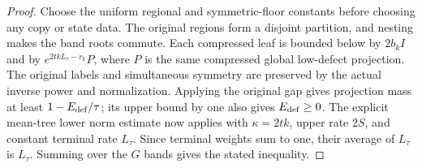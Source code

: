 \begin{proof}
  \leanok
  Choose the uniform regional and symmetric-floor constants before
  choosing any copy or state data. The original regions form a disjoint
  partition, and nesting makes the band roots commute.
  Each compressed leaf is bounded below by $2b_kI$ and by
  $e^{2tkL_\tau-r_k}P$, where $P$ is the same compressed global
  low-defect projection. The original labels and simultaneous symmetry
  are preserved by the actual inverse power and normalization.
  Applying the original gap gives projection mass at least
  $1-E_{\rm def}/\tau$; its upper bound by one also gives
  $E_{\rm def}\geq0$.
  The explicit mean-tree lower norm estimate now applies with
  $\kappa=2tk$, upper rate $2S$, and constant terminal rate $L_\tau$.
  Since terminal weights sum to one, their average of $L_\tau$ is
  $L_\tau$. Summing over the $G$ bands gives the stated inequality.
\end{proof}
